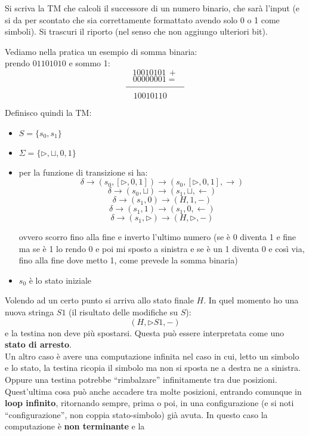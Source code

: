 \begin{esempio}
  Si scriva la TM che calcoli il successore di un numero binario, che sarà
  l'input (e si da per scontato che sia correttamente formattato avendo solo 0 o
  1 come simboli). Si trascuri il riporto (nel senso che non aggiungo ulteriori
  bit).\\
  \begin{shaded}
    Vediamo nella pratica un esempio di somma binaria:\\
    prendo $01101010$ e sommo 1:
    \[10010101 \, +\]
    \[00000001=\]
    \[\rule{70pt}{.4pt}\]
    \[10010110\,\,\,\,\,\,\,\]
  \end{shaded}
  Definisco quindi la TM:
  \begin{itemize}
    \item $S=\{s_0,s_1\}$
    \item $\Sigma =\{\triangleright, \sqcup, 0,1\}$
    \item per la funzione di transizione si ha:
    \[\delta\to(s_0,[\triangleright, 0,1])\to(s_0,[\triangleright, 0,1],
      \rightarrow)\]
    \[\delta\to(s_0,\sqcup)\to(s_1,\sqcup,\leftarrow)\]
    \[\delta\to(s_1,0)\to(H,1,-)\]
    \[\delta\to(s_1,1)\to(s_1,0,\leftarrow)\]
    \[\delta\to(s_1,\triangleright)\to(H,\triangleright,-)\]

    ovvero scorro fino alla fine e inverto l'ultimo numero 
    (se è 0 diventa 1 e fine ma se è 1 lo rendo 0 e poi mi sposto a sinistra e
    se è un 1 diventa 0 e così via, fino alla
    fine dove metto 1, come prevede la somma binaria)
    \item $s_0$ è lo stato iniziale
  \end{itemize}
\end{esempio}
Volendo ad un certo punto si arriva allo stato finale $H$. In quel momento ho
una nuova stringa $S1$ (il risultato delle modifiche su $S$):
\[(H,\triangleright S1, -)\]
e la testina non deve più spostarsi. Questa può essere interpretata come uno
\textbf{stato di arresto}.\\
Un altro caso è avere una computazione infinita nel caso in cui, letto un
simbolo e lo stato, la testina ricopia il simbolo ma non si sposta ne a destra
ne a sinistra. Oppure una testina potrebbe ``rimbalzare'' infinitamente tra due
posizioni. Quest'ultima cosa può anche accadere tra molte posizioni, entrando
comunque in \textbf{loop infinito}, ritornando sempre, prima o poi, in una
configurazione (e si noti ``configurazione'', non coppia stato-simbolo) già
avuta. In questo caso la computazione è \textbf{non terminante} e la
